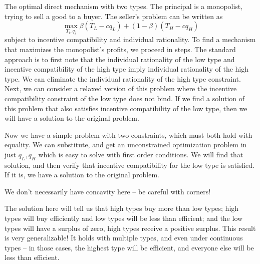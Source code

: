 \documentclass[12pt]{article}
\begin{document}
\begin{example}
	The optimal direct mechanism with two types. The principal is a monopolist, trying to sell a good to a buyer. The seller's problem can be written as
	\[
	\max_{T_i,q_i} \beta(T_L - cq_L) + (1-\beta) (T_H - cq_H)
	\]
	subject to incentive compatibility and individual rationality. To find a mechanism that maximizes the monopolist's profits, we proceed in steps. The standard approach is to first note that the individual rationality of the low type and incentive compatibility of the high type imply individual rationality of the high type. We can eliminate the individual rationality of the high type constraint. Next, we can consider a relaxed version of this problem where the incentive compatibility constraint of the low type does not bind. If we find a solution of this problem that also satisfies incentive compatibility of the low type, then we will have a solution to the original problem. 
	
	Now we have a simple problem with two constraints, which must both hold with equality. We can substitute, and get an unconstrained optimization problem in just $q_L,q_H$ which is easy to solve with first order conditions. We will find that solution, and then verify that incentive compatibility for the low type is satisfied. If it is, we have a solution to the original problem.
	\end{example}
	
\begin{remark}
	We don't necessarily have concavity here -- be careful with corners!
\end{remark}


\begin{remark}
	The solution here will tell us that high types buy more than low types; high types will buy efficiently and low types will be less than efficient; and the low types will have a surplus of zero, high types receive a positive surplus. This result is very generalizable! It holds with multiple types, and even under continuous types -- in those cases, the highest type will be efficient, and everyone else will be less than efficient.
\end{remark}
\end{document}
